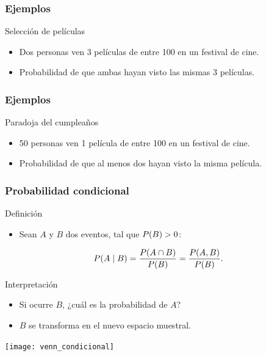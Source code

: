 \documentclass[table]{beamer}
\begin{document}
\begin{frame}
    \frametitle{Ejemplos}
    \begin{block}{Selección de películas}
        \begin{itemize}
            \item Dos personas ven 3 películas de entre 100 en un festival de cine.
            \item Probabilidad de que ambas hayan visto las mismas 3 películas.
        \end{itemize}
    \end{block}
\end{frame}

\begin{frame}
    \frametitle{Ejemplos}
    \begin{block}{Paradoja del cumpleaños}
        \begin{itemize}
            \item 50 personas ven 1 película de entre 100 en un festival de cine.
            \item Probabilidad de que al menos dos hayan visto la misma película.
        \end{itemize}
    \end{block}
\end{frame}

\begin{frame}
    \frametitle{Probabilidad condicional}
    \begin{block}{Definición}
        \begin{itemize}
            \item Sean $A$ y $B$ dos eventos, tal que $\prob{B} > 0$:
        \end{itemize}
        \begin{equation*}
            \prob{A \mid B} = \frac{\prob{A \cap B}}{\prob{B}} = \frac{\prob{A, B}}{\prob{B}} .
        \end{equation*}
    \end{block}
    \begin{block}{Interpretación}
        \begin{itemize}
            \item Si ocurre $B$, ¿cuál es la probabilidad de $A$?
            \item $B$ se transforma en el nuevo espacio muestral.
        \end{itemize}
    \end{block}
    \begin{center}
        \texttt{[image: venn\_condicional]}
    \end{center}
\end{frame}
\end{document}
